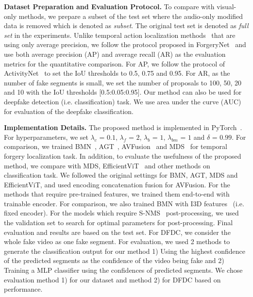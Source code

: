 \documentclass[conference, a4paper]{IEEEtran}
\makeatletter
\newcommand*{\ie}{i.e.\@\xspace}
\makeatother
\begin{document}
\noindent \textbf{Dataset Preparation and Evaluation Protocol.} To compare with visual-only methods, we prepare a subset of the test set where the audio-only modified data is removed which is denoted as \textit{subset}. The original test set is denoted as \textit{full set} in the experiments. Unlike temporal action localization methods~\cite{liu_multi-shot_2021, nawhal_activity_2021} that are using only average precision, we follow the protocol proposed in  ForgeryNet~\cite{he_forgerynet_2021} and use both average precision (AP) and average recall (AR) as the evaluation metrics for the quantitative comparison. For AP, we follow the protocol of ActivityNet~\cite{caba_heilbron_activitynet_2015} to set the IoU thresholds to 0.5, 0.75 and 0.95. For AR, as the number of fake segments is small, we set the number of proposals to 100, 50, 20 and 10 with the IoU thresholds [0.5:0.05:0.95]. Our method can also be used for deepfake detection (\ie classification) task. We use area under the curve (AUC) for evaluation of the deepfake classification.

\noindent \textbf{Implementation Details.} The proposed method is implemented in PyTorch~\cite{paszke_pytorch_2019}. For hyperparameters, we set $\lambda_c$ = $0.1$, $\lambda_f$ = $2$, $\lambda_b$ = $1$, $\lambda_{bm}$ = $1$ and $\delta$ = $0.99$. For comparison, we trained BMN~\cite{lin_bmn_2019}, AGT~\cite{nawhal_activity_2021}, AVFusion~\cite{bagchi_hear_2021} and MDS~\cite{chugh_not_2020} for temporal forgery localization task. In addition, to evaluate the usefulness of the proposed method, we compare with MDS, EfficientViT~\cite{coccomini_combining_2022} and other methods on classification task. We followed the original settings for BMN, AGT, MDS and EfficientViT, and used encoding concatenation fusion for AVFusion. For the methods that require pre-trained features, we trained them end-to-end with trainable encoder. For comparison, we also trained BMN with I3D features~\cite{carreira_quo_2017} (\ie fixed encoder). For the models which require S-NMS~\cite{bodla_soft-nms_2017} post-processing, we used the validation set to search for optimal parameters for post-processing. Final evaluation and results are based on the test set. For DFDC, we consider the whole fake video as one fake segment. For evaluation, we used 2 methods to generate the classification output for our method 1) Using the highest confidence of the predicted segments as the confidence of the video being fake and 2) Training a MLP classifier using the confidences of predicted segments. We chose evaluation method 1) for our dataset and method 2) for DFDC based on performance.
\end{document}
